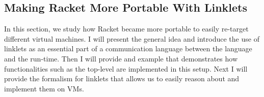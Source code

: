 \newpage

\subsection{Making Racket More Portable With Linklets}
\label{subsec:racket}

In this section, we study how Racket became more portable to easily
re-target different virtual machines. I will present the general idea
and introduce the use of linklets as an essential part of a
communication language between the language and the run-time. Then I
will provide and example that demonstrates how functionalities such as
the top-level are implemented in this setup. Next I will provide the
formalism for linklets that allows us to easily reason about and
implement them on VMs.




